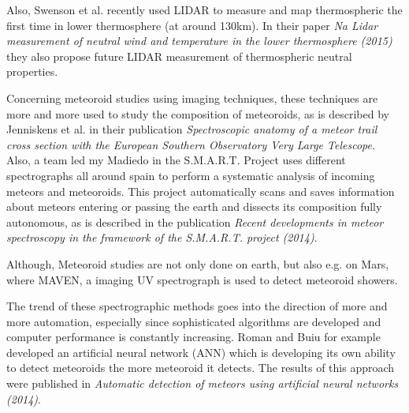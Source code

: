 Also, Swenson et al. recently used LIDAR to measure and map thermospheric the first time in lower thermosphere (at around 130km). In their paper \textit{Na Lidar measurement of neutral wind and temperature in the lower thermosphere (2015)} they also propose future LIDAR measurement of thermospheric neutral properties.

Concerning meteoroid studies using imaging techniques, these techniques are more and more used to study the composition of meteoroids, as is described by Jenniskens et al. in their publication \textit{Spectroscopic anatomy of a meteor trail cross section with the European Southern Observatory Very Large Telescope}.\\
Also, a team led my Madiedo in the S.M.A.R.T. Project uses different spectrographs all around spain to perform a systematic analysis of incoming meteors and meteoroids. This project automatically scans and saves information about meteors entering or passing the earth and dissects its composition fully autonomous, as is described in the publication \textit{Recent developments in meteor spectroscopy in the framework of the S.M.A.R.T. project (2014)}.

Although, Meteoroid studies are not only done on earth, but also e.g. on Mars, where MAVEN, a imaging UV spectrograph is used to detect meteoroid showers.

The trend of these spectrographic methods goes into the direction of more and more automation, especially since sophisticated algorithms are developed and computer performance is constantly increasing. Roman and Buiu for example developed an artificial neural network (ANN) which is developing its own ability to detect meteoroids the more meteoroid it detects. The results of this approach were published in \textit{Automatic detection of meteors using artificial neural networks (2014)}.


